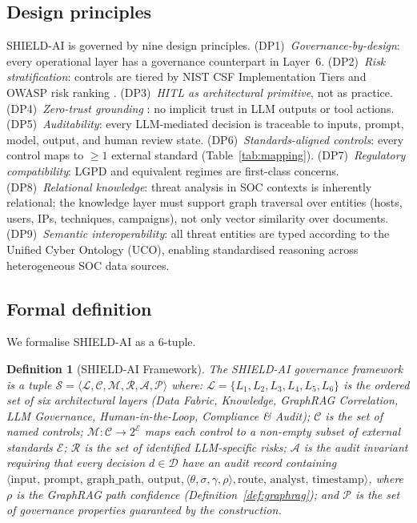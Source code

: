 \documentclass[preprint,12pt,authoryear]{elsarticle}
\newtheorem{definition}{Definition}
\begin{document}
\subsection{Design principles}
SHIELD-AI is governed by nine design principles.
(DP1)~\emph{Governance-by-design}: every operational layer has a governance counterpart in Layer~6.
(DP2)~\emph{Risk stratification}: controls are tiered by NIST CSF Implementation Tiers \citep{nist2024csf} and OWASP risk ranking \citep{owasp2025llm}.
(DP3)~\emph{HITL as architectural primitive}, not as practice.
(DP4)~\emph{Zero-trust grounding} \citep{nist2020sp800207}: no implicit trust in LLM outputs or tool actions.
(DP5)~\emph{Auditability}: every LLM-mediated decision is traceable to inputs, prompt, model, output, and human review state.
(DP6)~\emph{Standards-aligned controls}: every control maps to $\geq 1$ external standard (Table~\ref{tab:mapping}).
(DP7)~\emph{Regulatory compatibility}: LGPD \citep{lgpd2018} and equivalent regimes are first-class concerns.
(DP8)~\emph{Relational knowledge}: threat analysis in SOC contexts is inherently relational;
the knowledge layer must support graph traversal over entities (hosts, users, IPs, techniques,
campaigns), not only vector similarity over documents.
(DP9)~\emph{Semantic interoperability}: all threat entities are typed according to the
Unified Cyber Ontology (UCO), enabling standardised reasoning across heterogeneous SOC data sources.

\subsection{Formal definition}
\label{ssec:formal}
We formalise SHIELD-AI as a 6-tuple.

\begin{definition}[SHIELD-AI Framework]
\label{def:framework}
The SHIELD-AI governance framework is a tuple
$\mathcal{S} = \langle \mathcal{L}, \mathcal{C}, \mathcal{M}, \mathcal{R}, \mathcal{A}, \mathcal{P} \rangle$
where:
$\mathcal{L} = \{L_1, L_2, L_3, L_4, L_5, L_6\}$ is the ordered set of six architectural layers
(Data Fabric, Knowledge, GraphRAG Correlation, LLM Governance, Human-in-the-Loop,
Compliance \& Audit);
$\mathcal{C}$ is the set of named controls;
$\mathcal{M}: \mathcal{C} \to 2^{\mathcal{E}}$ maps each control to a non-empty subset of
external standards $\mathcal{E}$;
$\mathcal{R}$ is the set of identified LLM-specific risks;
$\mathcal{A}$ is the audit invariant requiring that every decision $d \in \mathcal{D}$ have
an audit record containing
$\langle \text{input, prompt, graph\_path, output}, \langle\theta, \sigma, \gamma, \rho\rangle,
\text{route, analyst, timestamp}\rangle$,
where $\rho$ is the GraphRAG path confidence (Definition~\ref{def:graphrag});
and $\mathcal{P}$ is the set of governance properties guaranteed by the construction.
\end{definition}
\end{document}
